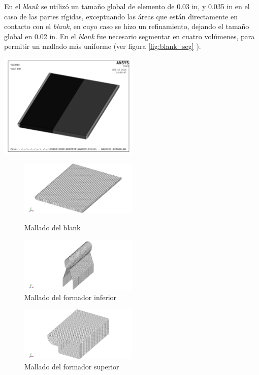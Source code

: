 En el \textit{blank} se utilizó un tamaño global de elemento de 0.03 in, y 0.035 in en el caso de las partes 
rígidas, exceptuando las áreas que están directamente en contacto con el \textit{blank}, en cuyo caso se hizo 
un refinamiento, dejando el tamaño global en 0.02 in. En el \textit{blank} fue necesario segmentar en cuatro 
volúmenes, para permitir un mallado más uniforme (ver figura \ref{fig:blank_seg} ).


\begin{center}
\includegraphics[width=0.5\textwidth]{src/ch3/blank_segmentado.pdf}
\label{fig:blank_seg}
\end{center}




\begin{figure}[!h]
\centering
\includegraphics[width=0.5\textwidth]{src/ch3/mesh_blank.png}
\label{fig:mesh_blank}
\caption{Mallado del blank}
\end{figure}


\begin{figure}[!h]
\centering
\includegraphics[width=0.5\textwidth]{src/ch3/mesh_fi.png}
\caption{Mallado del formador inferior}
\label{fig:mesh_fi}
\end{figure}

\begin{figure}[!h]
\centering
\includegraphics[width=0.5\textwidth]{src/ch3/mesh_fs.png}
\caption{Mallado del formador superior}
\label{fig:mesh_fi}
\end{figure}

